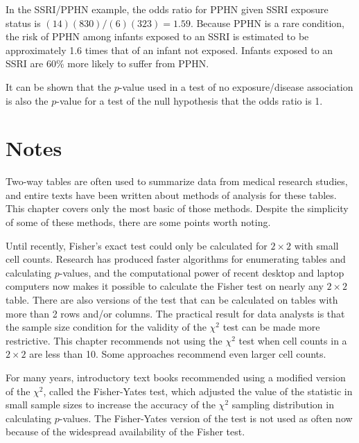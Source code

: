 In the SSRI/PPHN example, the odds ratio for PPHN given SSRI exposure status is $(14)(830)/(6)(323) = 1.59$.  Because PPHN is a rare condition, the risk of PPHN among infants exposed to an SSRI is estimated to be approximately 1.6 times that of an infant not exposed.  Infants exposed to an SSRI are 60\% more likely to suffer from PPHN.  

It can be shown that the $p$-value used in a test of no exposure/disease association is also the $p$-value for a test of the null hypothesis that the odds ratio is 1.


\section{Notes}

Two-way tables are often used to summarize data from medical research studies, and entire texts have been written about methods of analysis for these tables.  This chapter covers only the most basic of those methods.  Despite the simplicity of some of these methods, there are some points worth noting.

Until recently, Fisher's exact test could only be calculated for $2 \times 2$ with  small cell counts. Research has produced faster algorithms for enumerating tables and calculating $p$-values, and the computational power of recent desktop and laptop computers now makes it possible to calculate the Fisher test on nearly any $2 \times 2$ table.  There are also versions of the test that can be calculated on tables with more than 2 rows and/or columns.  The practical result for data analysts is that the sample size condition for the validity of the $\chi^2$ test can be made more restrictive.  This chapter recommends not using the $\chi^2$ test when cell counts in a $2 \times 2$ are less than 10.  Some approaches recommend even larger cell counts.

For many years, introductory text books recommended using a modified version of the $\chi^2$, called the Fisher-Yates test, which adjusted the value of the statistic in small sample sizes to increase the accuracy of the $\chi^2$ sampling distribution in calculating $p$-values.  The Fisher-Yates version of the test is not used as often now because of the widespread availability of the Fisher test.

